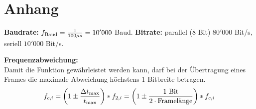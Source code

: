 \section{Anhang}
\textbf{Baudrate:} $f_{\rm Baud} = \frac{1}{100\mu s} = 10'000$ Baud. \quad
\textbf{Bitrate:} parallel (8 Bit) $80'000$ Bit/s, seriell $10'000$ Bit/s.

\vspace{0.5em}
\noindent\textbf{Frequenzabweichung:} \\
Damit die Funktion gewährleistet werden kann, darf bei der Übertragung eines Frames die maximale Abweichung höchstens 1 Bitbreite betragen.
$$ f_{c,i} = \left(1 \pm \frac{\Delta t_{\rm max}}{t_{\rm max}}\right) * f_{2,i} = \left(1 \pm \frac{1 \text{ Bit}}{2 \cdot \text{Framelänge}}\right) * f_{c,i} $$

\vspace{0.5em}
